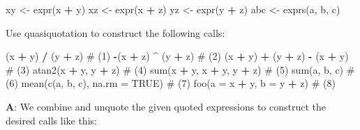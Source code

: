 \documentclass[
]{krantz}
\makeatletter
\newenvironment{Shaded}{\begin{snugshade}}{\end{snugshade}}
\newcommand{\CommentTok}[1]{\textcolor[rgb]{0.56,0.35,0.01}{\textit{#1}}}
\newcommand{\DataTypeTok}[1]{\textcolor[rgb]{0.13,0.29,0.53}{#1}}
\newcommand{\KeywordTok}[1]{\textcolor[rgb]{0.13,0.29,0.53}{\textbf{#1}}}
\newcommand{\NormalTok}[1]{#1}
\newcommand{\OperatorTok}[1]{\textcolor[rgb]{0.81,0.36,0.00}{\textbf{#1}}}
\newcommand{\OtherTok}[1]{\textcolor[rgb]{0.56,0.35,0.01}{#1}}
\newcommand{\StringTok}[1]{\textcolor[rgb]{0.31,0.60,0.02}{#1}}
\newenvironment{kframe}{%
\medskip{}
\setlength{\fboxsep}{.8em}
 \def\at@end@of@kframe{}%
 \ifinner\ifhmode%
  \def\at@end@of@kframe{\end{minipage}}%
  \begin{minipage}{\columnwidth}%
 \fi\fi%
 \def\FrameCommand##1{\hskip\@totalleftmargin \hskip-\fboxsep
 \colorbox{shadecolor}{##1}\hskip-\fboxsep
     \hskip-\linewidth \hskip-\@totalleftmargin \hskip\columnwidth}%
 \MakeFramed {\advance\hsize-\width
   \@totalleftmargin\z@ \linewidth\hsize
   \@setminipage}}%
 {\par\unskip\endMakeFramed%
 \at@end@of@kframe}
\renewenvironment{Shaded}{\begin{kframe}}{\end{kframe}}
\renewcommand{\KeywordTok} [1]{\textcolor[rgb]{0.00,0.44,0.13}{{#1}}}
\renewcommand{\DataTypeTok}[1]{\textcolor[rgb]{0.56,0.13,0.00}{{#1}}}
\renewcommand{\StringTok}  [1]{\textcolor[rgb]{0.25,0.44,0.63}{{#1}}}
\renewcommand{\CommentTok} [1]{\textcolor[rgb]{0.38,0.63,0.69}{{#1}}}
\renewcommand{\OtherTok}   [1]{\textcolor[rgb]{0.00,0.44,0.13}{{#1}}}
\renewcommand{\NormalTok}  [1]{{#1}}
\makeatother
\begin{document}
\begin{Shaded}
\begin{Highlighting}[]
\NormalTok{xy <-}\StringTok{ }\KeywordTok{expr}\NormalTok{(x }\OperatorTok{+}\StringTok{ }\NormalTok{y)}
\NormalTok{xz <-}\StringTok{ }\KeywordTok{expr}\NormalTok{(x }\OperatorTok{+}\StringTok{ }\NormalTok{z)}
\NormalTok{yz <-}\StringTok{ }\KeywordTok{expr}\NormalTok{(y }\OperatorTok{+}\StringTok{ }\NormalTok{z)}
\NormalTok{abc <-}\StringTok{ }\KeywordTok{exprs}\NormalTok{(a, b, c)}
\end{Highlighting}
\end{Shaded}

Use quasiquotation to construct the following calls:

\begin{Shaded}
\begin{Highlighting}[]
\NormalTok{(x }\OperatorTok{+}\StringTok{ }\NormalTok{y) }\OperatorTok{/}\StringTok{ }\NormalTok{(y }\OperatorTok{+}\StringTok{ }\NormalTok{z)               }\CommentTok{# (1)}
\OperatorTok{-}\NormalTok{(x }\OperatorTok{+}\StringTok{ }\NormalTok{z) }\OperatorTok{^}\StringTok{ }\NormalTok{(y }\OperatorTok{+}\StringTok{ }\NormalTok{z)              }\CommentTok{# (2)}
\NormalTok{(x }\OperatorTok{+}\StringTok{ }\NormalTok{y) }\OperatorTok{+}\StringTok{ }\NormalTok{(y }\OperatorTok{+}\StringTok{ }\NormalTok{z) }\OperatorTok{-}\StringTok{ }\NormalTok{(x }\OperatorTok{+}\StringTok{ }\NormalTok{y)     }\CommentTok{# (3)}
\KeywordTok{atan2}\NormalTok{(x }\OperatorTok{+}\StringTok{ }\NormalTok{y, y }\OperatorTok{+}\StringTok{ }\NormalTok{z)             }\CommentTok{# (4)}
\KeywordTok{sum}\NormalTok{(x }\OperatorTok{+}\StringTok{ }\NormalTok{y, x }\OperatorTok{+}\StringTok{ }\NormalTok{y, y }\OperatorTok{+}\StringTok{ }\NormalTok{z)        }\CommentTok{# (5)}
\KeywordTok{sum}\NormalTok{(a, b, c)                    }\CommentTok{# (6)}
\KeywordTok{mean}\NormalTok{(}\KeywordTok{c}\NormalTok{(a, b, c), }\DataTypeTok{na.rm =} \OtherTok{TRUE}\NormalTok{)  }\CommentTok{# (7)}
\KeywordTok{foo}\NormalTok{(}\DataTypeTok{a =}\NormalTok{ x }\OperatorTok{+}\StringTok{ }\NormalTok{y, }\DataTypeTok{b =}\NormalTok{ y }\OperatorTok{+}\StringTok{ }\NormalTok{z)       }\CommentTok{# (8)}
\end{Highlighting}
\end{Shaded}

\textbf{{A}}: We combine and unquote the given quoted expressions to construct the desired calls like this:
\end{document}
